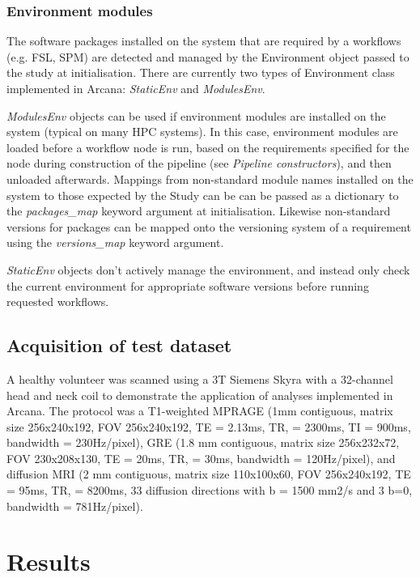 \documentclass[smallextended]{svjour3}       %
\begin{document}
\subsubsection*{Environment modules}

The software packages installed on the system that are required by a
workflows (e.g. FSL, SPM) are detected and managed by
the Environment object passed to the study at initialisation.
There are currently two types of Environment class implemented in Arcana:
\emph{StaticEnv} and \emph{ModulesEnv}.

\emph{ModulesEnv} objects can be used if environment
modules \citep{furlani_modules:_1991} are installed on the system (typical on many
HPC systems). In this case, environment modules are loaded before a workflow node is run,
based on the requirements specified for the node during construction of the pipeline
(see \emph{Pipeline constructors}), and then unloaded afterwards. Mappings from non-standard
module names installed on the system to those expected by the Study can be
can be passed as a dictionary to the \emph{packages\_map} keyword argument
at initialisation. Likewise non-standard versions for packages can be mapped
onto the versioning system of a requirement using the \emph{versions\_map}
keyword argument.

\emph{StaticEnv} objects don't actively manage the environment,
and instead only check the current environment for appropriate software
versions before running requested workflows.

\subsection*{Acquisition of test dataset}

A healthy volunteer was scanned using a 3T Siemens Skyra with a 32-channel head
and neck coil to demonstrate the application of analyses implemented in
Arcana. The protocol was a T1-weighted MPRAGE (1mm contiguous,
matrix size 256x240x192, FOV 256x240x192, TE = 2.13ms, TR, = 2300ms, TI
= 900ms, bandwidth = 230Hz/pixel), GRE (1.8 mm contiguous, matrix size
256x232x72, FOV 230x208x130, TE = 20ms, TR, = 30ms,
bandwidth = 120Hz/pixel), and diffusion MRI (2 mm contiguous, matrix size
110x100x60, FOV 256x240x192, TE = 95ms, TR, = 8200ms, 33 diffusion
directions with b = 1500 mm2/s and 3 b=0, bandwidth = 781Hz/pixel).

\section*{Results}
\label{results}
\end{document}
